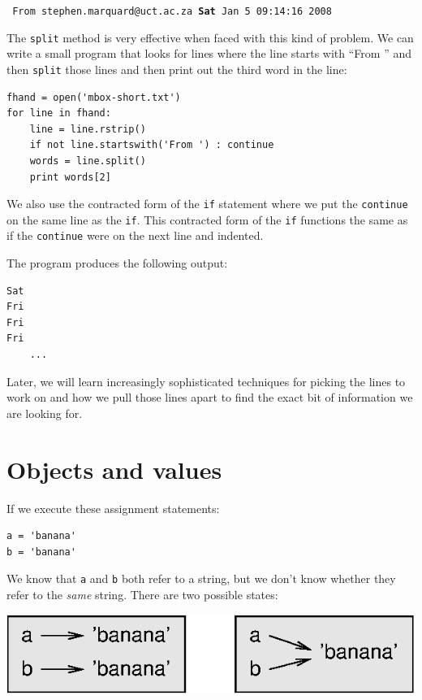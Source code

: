 \documentclass[10pt]{book}
\begin{document}
{\tt
From stephen.marquard@uct.ac.za {\bf Sat} Jan  5 09:14:16 2008
}

The {\tt split} method is very effective when faced with this 
kind of problem.
We can write a small program that looks for lines where the 
line starts with ``From '' and then {\tt split} those lines 
and then print out the third word in the line:

\beforeverb
\begin{verbatim}
fhand = open('mbox-short.txt')
for line in fhand:
    line = line.rstrip()
    if not line.startswith('From ') : continue
    words = line.split()
    print words[2]
\end{verbatim}
\afterverb
%
We also use the contracted form of the {\tt if}
statement where we put the {\tt continue } on the
same line as the {\tt if}.  This contracted form
of the {\tt if} functions the same as if the
{\tt continue} were on the next line and indented.

The program produces the following output:

\beforeverb
\begin{verbatim}
Sat
Fri
Fri
Fri
    ...
\end{verbatim}
\afterverb
%
Later, we will learn increasingly sophisticated techniques for
picking the lines to work on and how we pull those lines apart
to find the exact bit of information we are looking for.

\section{Objects and values}


If we execute these assignment statements:

\beforeverb
\begin{verbatim}
a = 'banana'
b = 'banana'
\end{verbatim}
\afterverb
%
We know that {\tt a} and {\tt b} both refer to a
string, but we don't
know whether they refer to the \emph{same} string.
There are two possible states:


\beforefig
\centerline{\includegraphics{figs/list1.eps}}
\afterfig
\end{document}
